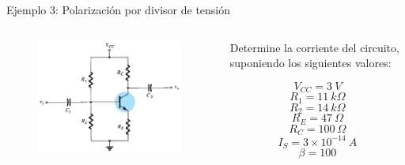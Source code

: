 \documentclass[t,aspectratio=169]{beamer}
\begin{document}
\begin{frame}{Ejemplo 3: Polarización por divisor de tensión}

\begin{columns}
\begin{column}{0.5\textwidth}

\begin{figure}
    \centering
    \includegraphics[width=\textwidth]{figures/polarizacion_divisor_tension.png}
\end{figure}

\end{column}
\begin{column}{0.5\textwidth}

Determine la corriente del circuito, suponiendo los siguientes valores:

\[ V_{CC} = 3\ V \]
%
\[ R_1 = 11\ k\Omega \]
%
\[ R_2 = 14\ k\Omega \]
%
\[ R_E = 47\ \Omega \]
%
\[ R_C = 100\ \Omega \]
%
\[ I_S = 3\times{}10^{-14}\ A \]
%
\[ \beta = 100 \]

\end{column}
\end{columns}

\end{frame}
\end{document}
